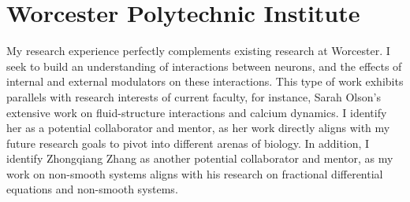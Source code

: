 \documentclass[a4paper,11pt]{article}
\begin{document}
\section{Worcester Polytechnic Institute}

My research experience perfectly complements existing research at Worcester. I seek to build an understanding of interactions between neurons, and the effects of internal and external modulators on these interactions. This type of work exhibits parallels with research interests of current faculty, for instance, Sarah Olson's extensive work on fluid-structure interactions and calcium dynamics. I identify her as a potential collaborator and mentor, as her work directly aligns with my future research goals to pivot into different arenas of biology. In addition, I identify Zhongqiang Zhang as another potential collaborator and mentor, as my work on non-smooth systems aligns with his research on fractional differential equations and non-smooth systems.



\end{document}
